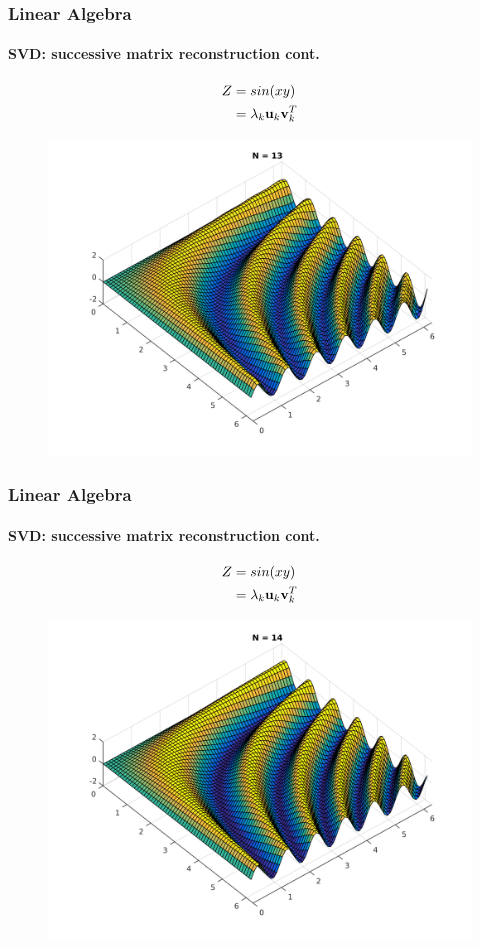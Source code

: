 \documentclass[hyperref={pdfpagelabels=true}]{beamer}
\begin{document}
\begin{frame}
\frametitle{Linear Algebra}
\framesubtitle{SVD: successive matrix reconstruction {\tiny cont.}} 
\small{
\begin{center}
\begin{align*}
Z &= sin(xy) \\
  &= \lambda_k{\bf u}_k {\bf v}_k^T
\end{align*}
\end{center}}
\begin{figure}[!htb]
\centering
\includegraphics [scale=0.415]{as/a13.png}
\end{figure}
\end{frame}

\begin{frame}
\frametitle{Linear Algebra}
\framesubtitle{SVD: successive matrix reconstruction {\tiny cont.}} 
\small{
\begin{center}
\begin{align*}
Z &= sin(xy) \\
  &= \lambda_k{\bf u}_k {\bf v}_k^T
\end{align*}
\end{center}}
\begin{figure}[!htb]
\centering
\includegraphics [scale=0.415]{as/a14.png}
\end{figure}
\end{frame}
\end{document}
